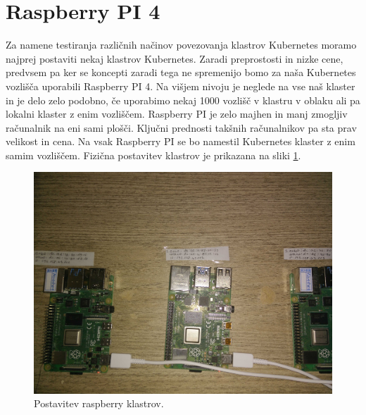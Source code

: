\documentclass[a4paper, 12pt]{book}
\begin{document}
\section{Raspberry PI 4}
Za namene testiranja različnih načinov povezovanja klastrov Kubernetes moramo najprej postaviti nekaj klastrov Kubernetes.
Zaradi preprostosti in nizke cene, predvsem pa ker se koncepti zaradi tega ne spremenijo bomo za naša Kubernetes vozlišča uporabili Raspberry PI 4.
  Na višjem nivoju je neglede na vse naš klaster in je delo zelo podobno, če uporabimo nekaj 1000 vozlišč v klastru v oblaku ali pa lokalni klaster z enim vozliščem.
Raspberry PI je zelo majhen in manj zmogljiv računalnik na eni sami plošči.
Ključni prednosti takšnih računalnikov pa sta prav velikost in cena.
Na vsak Raspberry PI se bo namestil Kubernetes klaster z enim samim vozliščem.
Fizična postavitev klastrov je prikazana na sliki \ref{rpi-klastri}.
\begin{figure}[h]
\begin{center}
\includegraphics[width=1.0\textwidth]{images/postavitev-raspberry.jpg}
\end{center}
\caption{Postavitev raspberry klastrov.}
\label{rpi-klastri}
\end{figure}
\end{document}
